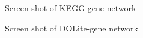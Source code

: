 \documentclass[a4paper]{article}
\begin{document}
\begin{figure}
\centering
\centering
{}
\caption{Screen shot of KEGG-gene network}
\label{KEGG-genes network}
\end{figure}

\begin{figure}
\centering
\centering
{}
\caption{Screen shot of DOLite-gene network}
\label{DOLite-genes network}
\end{figure}
\end{document}

